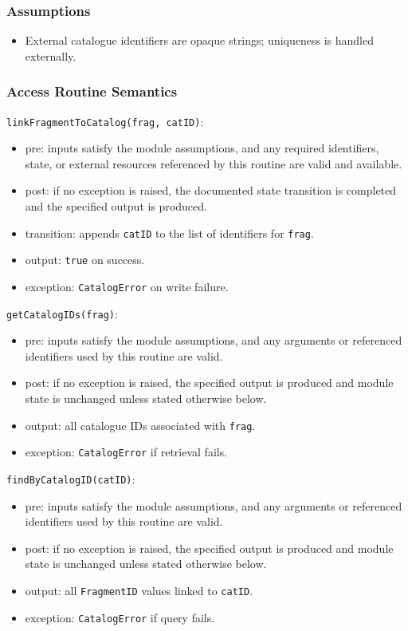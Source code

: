 \documentclass[12pt, titlepage]{article}
\begin{document}
\subsubsection{Assumptions}
\begin{itemize}
    \item External catalogue identifiers are opaque strings; uniqueness is handled externally.
\end{itemize}

\subsubsection{Access Routine Semantics}

\noindent \texttt{linkFragmentToCatalog(frag, catID)}:
\begin{itemize}
    \item pre: inputs satisfy the module assumptions, and any required identifiers, state, or external resources referenced by this routine are valid and available.
    \item post: if no exception is raised, the documented state transition is completed and the specified output is produced.
    \item transition: appends \texttt{catID} to the list of identifiers for \texttt{frag}.
    \item output: \texttt{true} on success.
    \item exception: \texttt{CatalogError} on write failure.
\end{itemize}

\noindent \texttt{getCatalogIDs(frag)}:
\begin{itemize}
    \item pre: inputs satisfy the module assumptions, and any arguments or referenced identifiers used by this routine are valid.
    \item post: if no exception is raised, the specified output is produced and module state is unchanged unless stated otherwise below.
    \item output: all catalogue IDs associated with \texttt{frag}.
    \item exception: \texttt{CatalogError} if retrieval fails.
\end{itemize}

\noindent \texttt{findByCatalogID(catID)}:
\begin{itemize}
    \item pre: inputs satisfy the module assumptions, and any arguments or referenced identifiers used by this routine are valid.
    \item post: if no exception is raised, the specified output is produced and module state is unchanged unless stated otherwise below.
    \item output: all \texttt{FragmentID} values linked to \texttt{catID}.
    \item exception: \texttt{CatalogError} if query fails.
\end{itemize}
\end{document}
